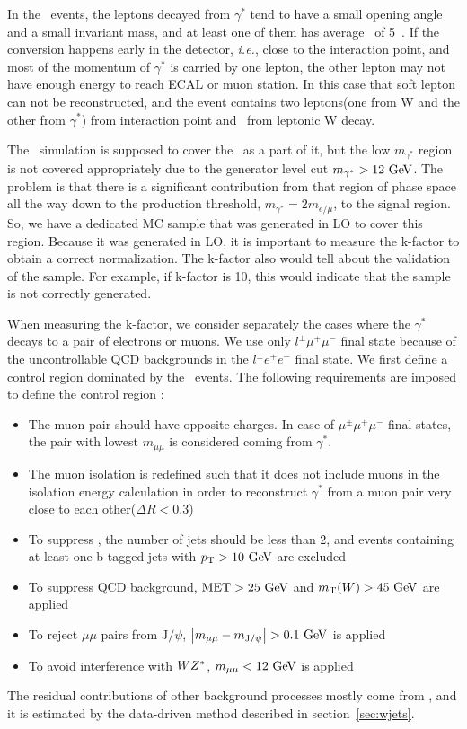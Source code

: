 In the \wgammastar\ events, the leptons decayed from $\gamma^*$ tend to have 
a small opening angle and a small invariant mass, and at least one of them 
has average \pt\ of 5~\GeV. If the conversion happens early in the detector, 
\textit{i.e.}, close to the interaction point,  
and most of the momentum of $\gamma^*$ is carried by one lepton, the other 
lepton may not have enough energy to reach ECAL or muon station. 
In this case that soft lepton can not be reconstructed, and the event 
contains two leptons(one from W and the other from $\gamma^*$) from interaction point 
and \met\ from leptonic W decay. 

The \wz\ simulation is supposed to cover the \wgammastar\ as a part of it, 
but the low $m_{\gamma^*}$ region is not covered appropriately due to the generator 
level cut $m_{\gamma^*}>12~\mathrm{Ge\kern -0.1em V}$. The problem is that there is a significant 
contribution from that region of phase space all the way down to the 
production threshold, $m_{\gamma^*}=2m_{e/\mu}$, to the signal region.
So, we have a dedicated MC sample that was generated in LO to cover this region.
Because it was generated in LO, it is important to measure the k-factor 
to obtain a correct normalization. The k-factor also would tell about the 
validation of the sample. For example, if k-factor is 10, this would indicate 
that the sample is not correctly generated.

When measuring the k-factor, we consider separately 
the cases where the $\gamma^*$ decays to a pair of electrons or muons. 
We use only $l^\pm\mu^+\mu^-$ final state 
because of the uncontrollable QCD backgrounds in the $l^\pm e^+ e^-$ final state. 
We first define a control region dominated by the \wgammastar\ events. 
The following requirements are imposed to define the control region :  
\begin{itemize} 
\item The muon pair should have opposite charges. In case of $\mu^\pm\mu^+\mu^-$ final states, 
      the pair with lowest $m_{\mu\mu}$ is considered coming from $\gamma^*$.
\item The muon isolation is redefined such that it does not include muons in the isolation 
      energy calculation in order to reconstruct $\gamma^*$ from a muon pair very close to 
      each other($\Delta R < 0.3$)
\item To suppress \topbkg, the number of jets should be less than 2, and events containing at least 
      one b-tagged jets with $p_\mathrm{T}>10~\mathrm{Ge\kern -0.1em V}$ are excluded
\item To suppress QCD background, $\mathrm{MET}>25~\mathrm{Ge\kern -0.1em V}$ and $m_{\mathrm{T}}(W)>45~\mathrm{Ge\kern -0.1em V}$ are applied 
\item To reject $\mu\mu$ pairs from $\textrm{J}/\psi$, 
      $\left| m_{\mu\mu} - m_{\textrm{J}/\psi}\right| > 0.1~\mathrm{Ge\kern -0.1em V}$ is applied
\item To avoid interference with $WZ^*$, $m_{\mu\mu} < 12~\mathrm{Ge\kern -0.1em V}$ is applied
\end{itemize} 
The residual contributions of other background processes mostly come from \Wjets, 
and it is estimated by the data-driven method described in section~\ref{sec:wjets}.

